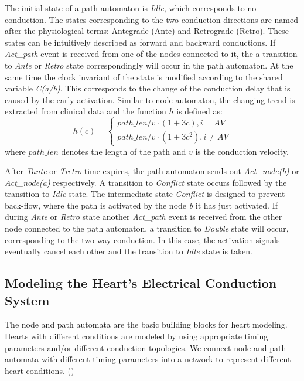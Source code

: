The initial state of a path automaton is \emph{Idle}, which corresponds to no conduction. The states corresponding to the two conduction directions are named after the physiological terms: Antegrade (Ante) and Retrograde (Retro). These states can be intuitively described as forward and backward conductions. If \emph{Act\_path} event is received from one of the nodes connected to it, the a transition to \emph{Ante} or \emph{Retro} state correspondingly will occur in the path automaton. At the same time the clock invariant of the state is modified according to the shared variable \emph{C(a/b)}. This corresponds to the change of the conduction delay that is caused by the early activation. Similar to node automaton, the changing trend is extracted from clinical data and the function $h$ is defined as:
\begin{equation} 
						h(c) = \left\{
						\begin{array}{lr}
						
						path\_len/v\cdot (1+3c), i=AV\\
						path\_len/v\cdot (1+3c^2), i\neq AV
						\end{array}
						\right.
						\end{equation}
where $path\_len$ denotes the length of the path and $v$ is the conduction velocity.

After \emph{Tante} or \emph{Tretro} time expires, the path automaton sends out \emph{Act\_node(b)} or \emph{Act\_node(a)} respectively. A transition to \emph{Conflict} state occurs followed by the transition to \emph{Idle} state. The intermediate state \emph{Conflict} is designed to prevent back-flow, where the path is activated by the node \emph{b} it has just activated. If during \emph{Ante} or \emph{Retro} state another \emph{Act\_path} event is received from the other node connected to the path automaton, a transition to \emph{Double} state will occur, corresponding to the two-way conduction. In this case, the activation signals eventually cancel each other and the transition to \emph{Idle} state is taken.

\subsection{Modeling the Heart's Electrical Conduction System}
The node and path automata are the basic building blocks for heart modeling. Hearts with different conditions are modeled by using appropriate timing parameters and/or different conduction topologies. We connect node and path automata with different timing parameters into a network to represent different heart conditions. () 

